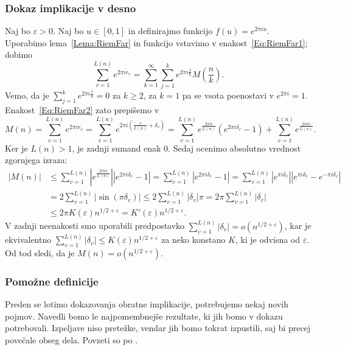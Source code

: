 \documentclass[mat1]{fmfdelo}
\begin{document}
\subsubsection{Dokaz implikacije v desno}
%
Naj bo $\varepsilon > 0$. Naj bo $u \in [0,1]$ in definirajmo funkcijo $f(u) = e^{2\pi iu}$. Uporabimo lema~\ref{Lema:RiemFar} in funkcijo vstavimo v enakost~\eqref{Eq:RiemFar1}; dobimo
\begin{equation}
\label{Eq:RiemFar2}
	\sum_{v=1}^{L(n)} e^{2\pi i r_{v}} = \sum_{k=1}^{\infty} \sum_{j=1}^{k} e^{2\pi i \frac{j}{k}} M \left(\frac{n}{k} \right).
\end{equation}
Vemo, da je $\sum_{j=1}^{k} e^{2\pi i \frac{j}{k}} = 0$ za $k \geq 2$, za $k=1$ pa se vsota poenostavi v $e^{2\pi i} = 1$.
Enakost~\eqref{Eq:RiemFar2} zato prepišemo v 
\[ M(n) = \sum_{v=1}^{L(n)} e^{2\pi i r_{v}} = \sum_{v=1}^{L(n)} e^{2\pi i \left(\frac{v}{L(n)} + \delta_{v} \right)} 
	   = \sum_{v=1}^{L(n)} e^{ \frac{2\pi i v}{L(n)} } \left(e^{2\pi i \delta_{v}} - 1 \right) + \sum_{v=1}^{L(n)} e^{ \frac{2\pi iv}{L(n)} }. \]
Ker je $L(n) > 1$, je zadnji sumand enak $0$. Sedaj ocenimo absolutno vrednost zgornjega izraza:
\begin{align*} 
|M(n)| &\leq \sum_{v=1}^{L(n)} \left|e^{ \frac{2\pi i v}{L(n)} } \right| \left|e^{2\pi i \delta_{v}} - 1 \right| 
	= \sum_{v=1}^{L(n)} \left|e^{2\pi i \delta_{v}} - 1 \right|
	= \sum_{v=1}^{L(n)} \left|e^{\pi i \delta_{v} } \right| \left|e^{\pi i \delta_{v}} - e^{-\pi i \delta_{v}}\right| \\
	&= 2 \sum_{v=1}^{L(n)} |\sin(\pi \delta_{v})| \leq 2 \sum_{v=1}^{L(n)} |\delta_{v}| \pi = 2 \pi \sum_{v=1}^{L(n)} |\delta_{v}| \\
	&\leq 2 \pi K(\varepsilon) n^{1/2 + \varepsilon} = K'(\varepsilon) n^{1/2 + \varepsilon}.
\end{align*}
V zadnji neenakosti smo uporabili predpostavko $ \sum_{v=1}^{L(n)}|\delta_{v}| = o(n^{1/2+\varepsilon}) $, kar je ekvivalentno 
$ \sum_{v=1}^{L(n)}|\delta_{v}| \leq K(\varepsilon) n^{1/2+\varepsilon}$ za neko konstano $K$, ki je odvisna od $\varepsilon$.
Od tod sledi, da je $M(n) = o(n^{1/2 + \varepsilon})$.

\subsubsection{Pomožne definicije}
Preden se lotimo dokazovanja obratne implikacije, potrebujemo nekaj novih pojmov. Navedli bomo le najpomembnejše rezultate, ki jih bomo v dokazu potrebovali. Izpeljave niso pretežke, vendar jih bomo tokrat izpustili, saj bi precej povečale obseg dela. Povzeti so po \cite[poglavje 6.2]{zetafunction}.
\end{document}
